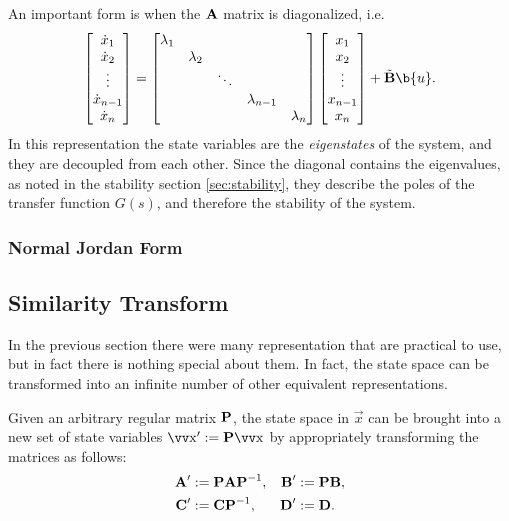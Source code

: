 An important form is when the \(\bm{\mathrm{A}}\) matrix is diagonalized, i.e.
\[
	\begin{bmatrix}
		\dot{x}_1 \\ \dot{x}_2 \\ \vdots \\ \dot{x}_{n-1} \\ \dot{x}_n
	\end{bmatrix}
	=
	\begin{bmatrix}
		\lambda_1 \\
		& \lambda_2 \\
		& & \ddots \\
		& & & \lambda_{n-1} \\
		& & & & \lambda_n
	\end{bmatrix}
	\begin{bmatrix}
		x_1 \\ x_2 \\ \vdots \\ x_{n-1} \\ x_n
	\end{bmatrix}
	+
	\tilde{\mx{B}}\b{u}.
\]
In this representation the state variables are the \emph{eigenstates} of the system, and they are decoupled from each other. Since the diagonal contains the eigenvalues, as noted in the stability section \ref{sec:stability}, they describe the poles of the transfer function \(G(s)\), and therefore the stability of the system.

\subsubsection{Normal Jordan Form}


\subsection{Similarity Transform}

In the previous section there were many representation that are practical to use, but in fact there is nothing special about them. In fact, the state space can be transformed into an infinite number of other equivalent representations.

Given an arbitrary regular matrix \(\bm{\mathrm{P}}\), the state space in \(\vec{x}\) can be brought into a new set of state variables \(\vec{x}' := \mx{P} \vec{x}\) by appropriately transforming the matrices as follows:
\begin{align*}
	\bm{\mathrm{A}}' &:= \bm{\mathrm{P}} \bm{\mathrm{A}} \bm{\mathrm{P}}^{-1}, &
	\bm{\mathrm{B}}'	&:= \bm{\mathrm{P}} \bm{\mathrm{B}}, \\
	\bm{\mathrm{C}}' &:= \bm{\mathrm{C}} \bm{\mathrm{P}}^{-1}, &
	\bm{\mathrm{D}}' &:= \bm{\mathrm{D}}.
\end{align*}

